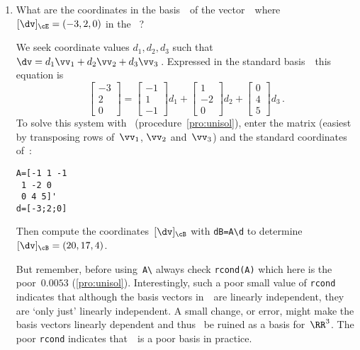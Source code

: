 \begin{example}
\begin{enumerate}
\item What are the coordinates in the basis~\cB\ of the vector~\dv\ where \([\dv]_\cE=(-3,2,0)\) in the ~\cE?
\begin{solution} 
We seek coordinate values \(d_1,d_2,d_3\) such that \(\dv=d_1\vv_1+d_2\vv_2+d_3\vv_3\)\,. 
Expressed in the standard basis~\cE\ this equation is
\begin{equation*}
\begin{bmatrix} -3\\2\\0 \end{bmatrix}=
\begin{bmatrix} -1\\1\\-1 \end{bmatrix}d_1+
\begin{bmatrix} 1\\-2\\0 \end{bmatrix}d_2+
\begin{bmatrix} 0\\4\\5 \end{bmatrix}d_3\,.
\end{equation*}
To solve this system with \script\ (procedure~\ref{pro:unisol}), enter the matrix (easiest by transposing rows of~\(\vv_1\), \(\vv_2\) and~\(\vv_3\)) and the standard coordinates of~\dv:
\begin{verbatim}
A=[-1 1 -1
 1 -2 0
 0 4 5]'
d=[-3;2;0]
\end{verbatim}
\setbox\ajrqrbox\hbox{}%
\marginpar{\usebox{\ajrqrbox}}%
Then compute the coordinates~\([\dv]_\cB\) with \verb|dB=A\d| to determine \([\dv]_\cB=(20,17,4)\).

But remember, before using~\verb|A\| always check \verb|rcond(A)| which here is the poor~\(0.0053\) (\autoref{pro:unisol}).
Interestingly, such a poor small value of \verb|rcond| indicates that although the basis vectors in~\cB\ are linearly independent, they are `only just' linearly independent.
A small change, or error, might make the basis vectors linearly dependent and thus \cB~be ruined as a basis for~\(\RR^3\).
The poor \verb|rcond| indicates that~\cB\ is a poor basis in practice.
\end{solution}
\end{enumerate}
\end{example}





